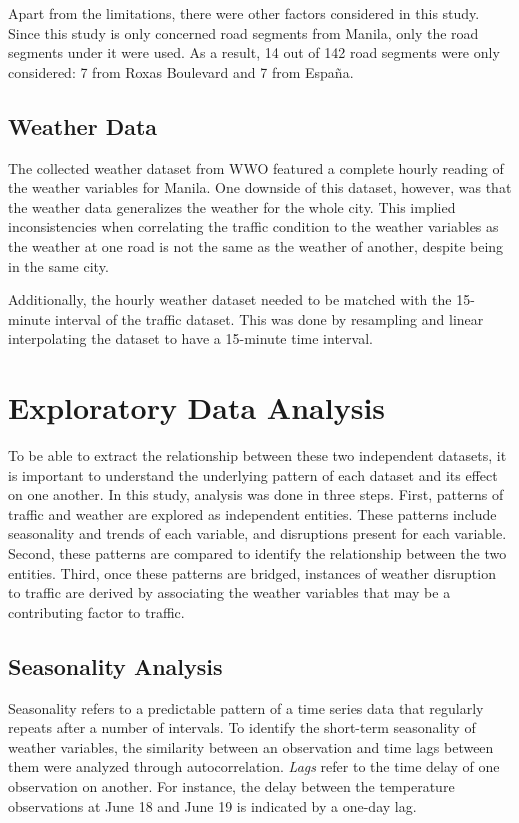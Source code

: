 Apart from the limitations, there were other factors considered in this study. Since this study is only concerned road segments from Manila, only the road segments under it were used. As a result, 14 out of 142 road segments were only considered: 7 from Roxas Boulevard and 7 from España.

\subsection{Weather Data}
The collected weather dataset from WWO featured a complete hourly reading of the weather variables for Manila. One downside of this dataset, however, was that the weather data generalizes the weather for the whole city. This implied inconsistencies when correlating the traffic condition to the weather variables as the weather at one road is not the same as the weather of another, despite being in the same city.

Additionally, the hourly weather dataset needed to be matched with the 15-minute interval of the traffic dataset. This was done by resampling and linear interpolating the dataset to have a 15-minute time interval.

\section{Exploratory Data Analysis}
To be able to extract the relationship between these two independent datasets, it is important to understand the underlying pattern of each dataset and its effect on one another. In this study, analysis was  done in three steps. First, patterns of traffic and weather are explored as independent entities. These patterns include seasonality and trends of each variable, and disruptions present for each variable. Second, these patterns are compared to identify the relationship between the two entities. Third, once these patterns are bridged, instances of weather disruption to traffic are derived by associating the weather variables that may be a contributing factor to traffic.

\subsection{Seasonality Analysis}
Seasonality refers to a predictable pattern of a time series data that regularly repeats after a number of intervals. To identify the short-term seasonality of weather variables, the similarity between an observation and time lags between them were analyzed through autocorrelation. \textit{Lags} refer to the time delay of one observation on another. For instance, the delay between the temperature observations at June 18 and June 19 is indicated by a one-day lag.

